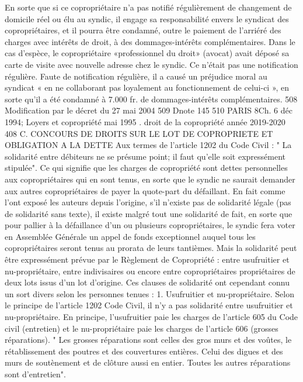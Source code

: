 En sorte que si ce copropriétaire n’a pas notifié régulièrement de changement de domicile réel ou élu au syndic, il engage sa responsabilité envers le syndicat des copropriétaires, et il pourra être condamné, outre le paiement de l’arriéré des charges avec intérêts de droit, à des dommages-intérêts complémentaires.
Dans le cas d’espèce, le copropriétaire «professionnel du droit» (avocat) avait déposé sa carte de visite avec nouvelle adresse chez le syndic. Ce n’était pas une notification régulière. Faute de notification régulière, il a causé un préjudice moral au syndicat « en ne collaborant pas loyalement au fonctionnement de celui-ci », en sorte qu’il a été condamné à 7.000 fr. de dommages-intérêts complémentaires.
508 Modification par le décret du 27 mai 2004
509 D\degres note 145
510 PARIS 8\degres Ch. 6 déc 1994; Loyers et copropriété mai 1995 .
droit de la copropriété année 2019-2020
408
C. CONCOURS DE DROITS SUR LE LOT DE COPROPRIETE ET OBLIGATION A LA DETTE
Aux termes de l'article 1202 du Code Civil :
" La solidarité entre débiteurs ne se présume point; il faut qu'elle soit expressément stipulée".
Ce qui signifie que les charges de copropriété sont dettes personnelles aux copropriétaires qui en sont tenus, en sorte que le syndic ne saurait demander aux autres copropriétaires de payer la quote-part du défaillant.
En fait comme l'ont exposé les auteurs depuis l'origine, s'il n'existe pas de solidarité légale (pas de solidarité sans texte), il existe malgré tout une solidarité de fait, en sorte que pour pallier à la défaillance d'un ou plusieurs copropriétaires, le syndic fera voter en Assemblée Générale un appel de fonds exceptionnel auquel tous les copropriétaires seront tenus au prorata de leurs tantièmes.
Mais la solidarité peut être expressément prévue par le Règlement de Copropriété : entre usufruitier et nu-propriétaire, entre indivisaires ou encore entre copropriétaires propriétaires de deux lots issus d'un lot d'origine.
Ces clauses de solidarité ont cependant connu un sort divers selon les personnes tenues :
1. Usufruitier et nu-propriétaire.
Selon le principe de l'article 1202 Code Civil, il n'y a pas solidarité entre usufruitier et nu-propriétaire.
En principe, l'usufruitier paie les charges de l'article 605 du Code civil (entretien) et le nu-propriétaire paie les charges de l'article 606 (grosses réparations).
" Les grosses réparations sont celles des gros murs et des voûtes, le rétablissement des poutres et des couvertures entières. Celui des digues et des murs de soutènement et de clôture aussi en entier. Toutes les autres réparations sont d'entretien".
